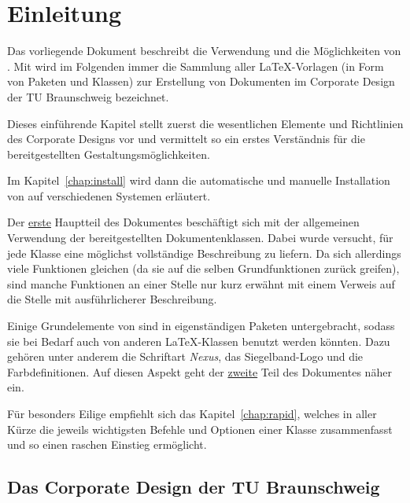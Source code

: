 \chapter{Einleitung}

Das vorliegende Dokument beschreibt die Verwendung und die Möglichkeiten von \tubslatex.
Mit \tubslatex wird im Folgenden immer die Sammlung aller \LaTeX-Vorlagen
(in Form von Paketen und Klassen) zur Erstellung von Dokumenten im
Corporate Design der TU Braunschweig bezeichnet.

Dieses einführende Kapitel stellt zuerst die wesentlichen Elemente und Richtlinien
des Corporate Designs vor und vermittelt so ein erstes Verständnis für
die bereitgestellten Gestaltungsmöglichkeiten.

Im Kapitel~\ref{chap:install} wird dann die automatische und manuelle
Installation von \tubslatex auf verschiedenen Systemen erläutert.

Der \hyperlink{part:user}{erste} Hauptteil des Dokumentes beschäftigt sich mit
der allgemeinen Verwendung der bereitgestellten Dokumentenklassen.
Dabei wurde versucht, für jede Klasse eine möglichst vollständige Beschreibung
zu liefern. Da sich allerdings viele Funktionen gleichen
(da sie auf die selben Grundfunktionen zurück greifen),
sind manche Funktionen an einer Stelle nur kurz erwähnt mit einem Verweis
auf die Stelle mit ausführlicherer Beschreibung.

Einige Grundelemente von \tubslatex sind in eigenständigen Paketen untergebracht,
sodass sie bei Bedarf auch von anderen \LaTeX-Klassen benutzt werden könnten.
Dazu gehören unter anderem die Schriftart \emph{Nexus}, das Siegelband-Logo
und die Farbdefinitionen.
Auf diesen Aspekt geht der \hyperlink{part:packages}{zweite}
Teil des Dokumentes näher ein.

Für besonders Eilige empfiehlt sich das Kapitel~\ref{chap:rapid},
welches in aller Kürze die jeweils wichtigsten Befehle und Optionen einer Klasse
zusammenfasst und so einen raschen Einstieg ermöglicht.

\clearpage
\section{Das Corporate Design der TU Braunschweig}

